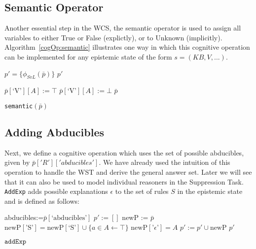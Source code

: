 \subsection{Semantic Operator}

Another essential step in the WCS, the semantic operator is used to assign all variables to either True or False (explictly), or to Unknown (implicitly). Algorithm~\ref{cogOp:semantic} illustrates one way in which this cognitive operation can be implemented for any epistemic state of the form $s=(KB,V,...)$.

\begin{algorithm}[H] 
\SetAlgoLined
{}
{
$p'= \{\phi_{SvL}(\bar{p})\}$\;
\Return $p'$
}

{
{
{
$\bar{p}[\textrm{`V'}][A]:=\top$
}
}
{
{
$\bar{p}[\textrm{`V'}][A]:=\bot$
}
}
\Return $\bar{p}$
}

\caption{\texttt{semantic}$(\bar{p})$}
\label{cogOp:semantic}
\end{algorithm}

\subsection{Adding Abducibles} \label{ssec:abd}
Next, we define a cognitive operation which uses the set of possible abducibles, given by $\bar{p}['R']['abducibles']$. We have already used the intuition of this operation to handle the WST and derive the general answer set. Later we will see that it can also be used to model individual reasoners in the Suppression Task. \texttt{AddExp} adds possible explanations $\epsilon$ to the set of rules $S$ in the epistemic state and is defined as follows:

\begin{algorithm}[H] 
\SetAlgoLined
{}
{
abducibles:=$\bar{p}[\textrm{`abducibles'}]$\;
$p':=[]$\;
{
newP := $\bar{p}$\;
$\text{newP}[\textrm{'S'}]=\text{newP}[\textrm{`S'}] \cup \{a \in A\leftarrow \top\}$\;
$\text{newP}[\textrm{'}\epsilon \textrm{'}]=A$\;
$p':=p' \cup \text{newP}$\;
}
\Return $p'$
}

\caption{$\texttt{addExp}$}
\label{cogOp:addExp}
\end{algorithm}


